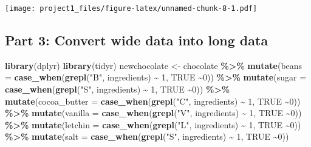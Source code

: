 \documentclass[
]{article}
\newenvironment{Shaded}{\begin{snugshade}}{\end{snugshade}}
\newcommand{\AttributeTok}[1]{\textcolor[rgb]{0.13,0.29,0.53}{#1}}
\newcommand{\ConstantTok}[1]{\textcolor[rgb]{0.56,0.35,0.01}{#1}}
\newcommand{\DecValTok}[1]{\textcolor[rgb]{0.00,0.00,0.81}{#1}}
\newcommand{\FunctionTok}[1]{\textcolor[rgb]{0.13,0.29,0.53}{\textbf{#1}}}
\newcommand{\NormalTok}[1]{#1}
\newcommand{\OtherTok}[1]{\textcolor[rgb]{0.56,0.35,0.01}{#1}}
\newcommand{\SpecialCharTok}[1]{\textcolor[rgb]{0.81,0.36,0.00}{\textbf{#1}}}
\newcommand{\StringTok}[1]{\textcolor[rgb]{0.31,0.60,0.02}{#1}}
\begin{document}
\texttt{[image: project1\_files/figure-latex/unnamed-chunk-8-1.pdf]}

\hypertarget{part-3-convert-wide-data-into-long-data}{%
\subsection{Part 3: Convert wide data into long
data}\label{part-3-convert-wide-data-into-long-data}}

\begin{Shaded}
\begin{Highlighting}[]
\FunctionTok{library}\NormalTok{(dplyr)}
\FunctionTok{library}\NormalTok{(tidyr)}
\NormalTok{newchocolate }\OtherTok{\textless{}{-}}\NormalTok{ chocolate }\SpecialCharTok{\%\textgreater{}\%} \FunctionTok{mutate}\NormalTok{(}\AttributeTok{beans =} \FunctionTok{case\_when}\NormalTok{(}\FunctionTok{grepl}\NormalTok{(}\StringTok{"B"}\NormalTok{, ingredients) }\SpecialCharTok{\textasciitilde{}} \DecValTok{1}\NormalTok{, }\ConstantTok{TRUE} \SpecialCharTok{\textasciitilde{}}\DecValTok{0}\NormalTok{)) }\SpecialCharTok{\%\textgreater{}\%} \FunctionTok{mutate}\NormalTok{(}\AttributeTok{sugar =} \FunctionTok{case\_when}\NormalTok{(}\FunctionTok{grepl}\NormalTok{(}\StringTok{"S"}\NormalTok{, ingredients) }\SpecialCharTok{\textasciitilde{}} \DecValTok{1}\NormalTok{, }\ConstantTok{TRUE} \SpecialCharTok{\textasciitilde{}}\DecValTok{0}\NormalTok{)) }\SpecialCharTok{\%\textgreater{}\%} \FunctionTok{mutate}\NormalTok{(}\AttributeTok{cocoa\_butter =} \FunctionTok{case\_when}\NormalTok{(}\FunctionTok{grepl}\NormalTok{(}\StringTok{"C"}\NormalTok{, ingredients) }\SpecialCharTok{\textasciitilde{}} \DecValTok{1}\NormalTok{, }\ConstantTok{TRUE} \SpecialCharTok{\textasciitilde{}}\DecValTok{0}\NormalTok{)) }\SpecialCharTok{\%\textgreater{}\%} \FunctionTok{mutate}\NormalTok{(}\AttributeTok{vanilla =} \FunctionTok{case\_when}\NormalTok{(}\FunctionTok{grepl}\NormalTok{(}\StringTok{"V"}\NormalTok{, ingredients) }\SpecialCharTok{\textasciitilde{}} \DecValTok{1}\NormalTok{, }\ConstantTok{TRUE} \SpecialCharTok{\textasciitilde{}}\DecValTok{0}\NormalTok{)) }\SpecialCharTok{\%\textgreater{}\%} \FunctionTok{mutate}\NormalTok{(}\AttributeTok{letchin =} \FunctionTok{case\_when}\NormalTok{(}\FunctionTok{grepl}\NormalTok{(}\StringTok{"L"}\NormalTok{, ingredients) }\SpecialCharTok{\textasciitilde{}} \DecValTok{1}\NormalTok{, }\ConstantTok{TRUE} \SpecialCharTok{\textasciitilde{}}\DecValTok{0}\NormalTok{)) }\SpecialCharTok{\%\textgreater{}\%} \FunctionTok{mutate}\NormalTok{(}\AttributeTok{salt =} \FunctionTok{case\_when}\NormalTok{(}\FunctionTok{grepl}\NormalTok{(}\StringTok{"S"}\NormalTok{, ingredients) }\SpecialCharTok{\textasciitilde{}} \DecValTok{1}\NormalTok{, }\ConstantTok{TRUE} \SpecialCharTok{\textasciitilde{}}\DecValTok{0}\NormalTok{))}

\end{Highlighting}
\end{Shaded}
\end{document}
